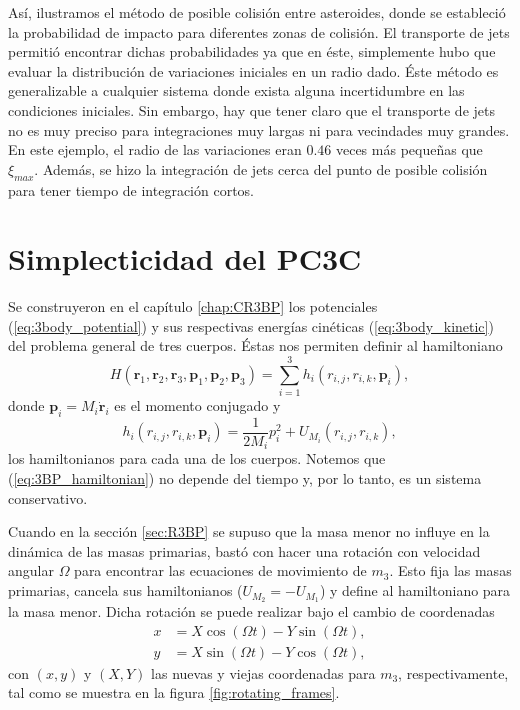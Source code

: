 Así, ilustramos el método de posible colisión entre asteroides, donde se estableció la probabilidad de impacto para diferentes zonas de colisión. El transporte de jets permitió encontrar dichas probabilidades ya que en éste, simplemente hubo que evaluar la distribución de variaciones iniciales en un radio dado. Éste método es generalizable a cualquier sistema donde exista alguna incertidumbre en las condiciones iniciales. Sin embargo, hay que tener claro que el transporte de jets no es muy preciso para integraciones muy largas ni para vecindades muy grandes. En este ejemplo, el radio de las variaciones eran $0.46$ veces más pequeñas que $\xi_{max}$. Además, se hizo la integración de jets cerca del punto de posible colisión para tener tiempo de integración cortos. 


\section{Simplecticidad del PC3C}
\label{sec:C3BP_simplecticity}

Se construyeron en el capítulo \ref{chap:CR3BP} los potenciales (\ref{eq:3body_potential}) y sus respectivas energías cinéticas (\ref{eq:3body_kinetic}) del problema general de tres cuerpos. Éstas nos permiten definir al hamiltoniano
\begin{equation}
 H(\mathbf{r}_1, \mathbf{r}_2, \mathbf{r}_3, \mathbf{p}_1, \mathbf{p}_2, \mathbf{p}_3) = \sum_{i=1}^3 h_i(r_{i,j}, r_{i,k}, \mathbf{p}_i),
 \label{eq:3BP_hamiltonian}
\end{equation} 
donde $\mathbf{p}_i = M_i \dot{\mathbf{r}}_i$ es el momento conjugado y
\begin{equation}
 h_i(r_{i,j}, r_{i,k}, \mathbf{p}_i) = \frac{1}{2 M_i} p_i^2 + U_{M_i}(r_{i,j}, r_{i,k}),
 \label{eq:individual_hamiltonian}
\end{equation}
los hamiltonianos para cada una de los cuerpos. Notemos que (\ref{eq:3BP_hamiltonian}) no depende del tiempo y, por lo tanto, es un sistema conservativo. 

Cuando en la sección \ref{sec:R3BP} se supuso que la masa menor no influye en la dinámica de las masas primarias, bastó con hacer una rotación con velocidad angular $\Omega$ para encontrar las ecuaciones de movimiento de $m_3$. Esto fija las masas primarias, cancela sus hamiltonianos ($  U_{M_2} = - U_{M_1}$) y define al hamiltoniano para la masa menor. Dicha rotación se puede realizar bajo el cambio de coordenadas
\begin{align*}
 x &= X\cos (\Omega t) - Y \sin (\Omega t), \\
 y &= X\sin (\Omega t) - Y \cos (\Omega t), 
\end{align*} 
con $(x,y)$ y $(X,Y)$ las nuevas y viejas coordenadas para $m_3$, respectivamente, tal como se muestra en la figura \ref{fig:rotating_frames}.

